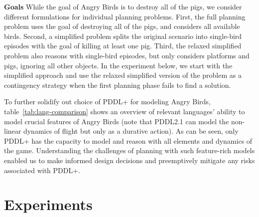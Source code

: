 \textbf{Goals}
While the goal of Angry Birds is to destroy all of the pigs, we consider different formulations for individual planning problems. First, the full planning problem uses the goal of destroying all of the pigs, and considers all available birds. Second, a simplified problem splits the original scenario into single-bird episodes with the goal of killing at least one pig. Third, the relaxed simplified problem also reasons with single-bird episodes, but only considers platforms and pigs, ignoring all other objects. In the experiment below, we start with the simplified approach and use the relaxed simplified version of the problem as a contingency strategy when the first planning phase fails to find a solution.

\setlength{\belowcaptionskip}{-10pt}
\begin{table}[h]
\centering
\scriptsize
{}
\caption{Language support for crucial Angry Birds features.}
\label{tab:lang-comparison}
\end{table}

\smallskip
To further solidify out choice of PDDL+ for modeling Angry Birds, table~\ref{tab:lang-comparison} shows an overview of relevant languages' ability to model crucial features of Angry Birds (note that PDDL2.1 can model the non-linear dynamics of flight but only as a durative action). As can be seen, only PDDL+ has the capacity to model and reason with all elements and dynamics of the game. Understanding the challenges of planning with such feature-rich models enabled us to make informed design decisions and preemptively mitigate any risks associated with PDDL+.



\section{Experiments}


